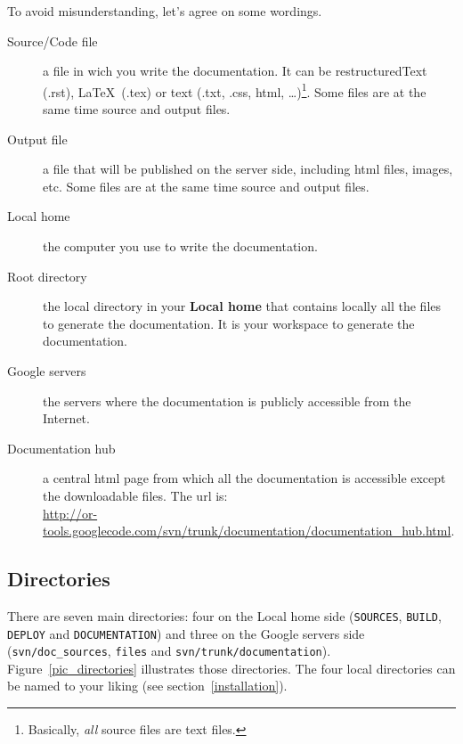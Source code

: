 \documentclass[a4paper,10pt]{article}
\newcommand{\code}[1]{\texttt{#1}}
\begin{document}
To avoid misunderstanding, let's agree on some wordings.

\begin{description}
 \item[Source/Code file] a file in wich you write the documentation. It can be restructuredText (.rst), \LaTeX\ (.tex) or text (.txt, .css, html, \ldots)\footnote{Basically, \emph{all} source files are text files.}. Some files are at the same time source and output files.
 \item[Output file] a file that will be published on the server side, including html files, images, etc. Some files are at the same time source and output files.
 \item[Local home] the computer you use to write the documentation.
\item[Root directory] the local directory in your {\bf Local home} that contains locally all the files to generate the documentation. It is your workspace to generate the documentation.
 \item[Google servers] the servers where the documentation is publicly accessible from the Internet.
 \item[Documentation hub] a central html page from which all the documentation is accessible except the downloadable files. The url is:\\
 \href{http://or-tools.googlecode.com/svn/trunk/documentation/documentation\_hub.html}{http://or-tools.googlecode.com/svn/trunk/documentation/documentation\_hub.html}.
\end{description}

\subsection{Directories}

There are seven main directories: four on the Local home side (\code{SOURCES}, \code{BUILD}, \code{DEPLOY} and \code{DOCUMENTATION}) and three on the Google servers side (\code{svn/doc\_sources}, \code{files} and  \code{svn/trunk/documentation}). Figure~\ref{pic_directories} illustrates those directories. The four local directories can be named to your liking (see section~\ref{installation}).
\end{document}
